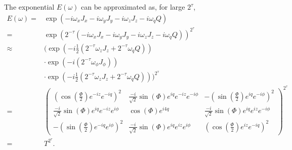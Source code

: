 \documentclass{jors}
\begin{document}
		The exponential \(E(\omega)\) can be approximated as, for large \(2^\tau\),
		\begin{align}
			E(\omega) =& \exp\left(-i\omega_x J_x - i\omega_y J_y - i\omega_z J_z - i\omega_q Q\right)\\
			=& \exp\left(2^{-\tau}\left(-i\omega_x J_x - i\omega_y J_y - i\omega_z J_z - i\omega_q Q\right)\right)^{2^\tau}\\
			\approx& \biggl(\exp\left(-i\frac12\left(2^{-\tau} \omega_z J_z + 2^{-\tau}\omega_q Q\right)\right)\nonumber\\
			&\cdot\exp\left(-i\left(2^{-\tau} \omega_\phi J_\phi\right)\right)\nonumber\\
			&\cdot\exp\left(-i\frac12\left(2^{-\tau} \omega_z J_z + 2^{-\tau} \omega_q Q\right)\right)\biggr)^{2^\tau}\\
			=& \begin{pmatrix}
				\left(\cos\left(\frac{\Phi}{2}\right) e^{-iz}e^{-iq}\right)^2 & \frac{-i}{\sqrt{2}} \sin(\Phi)e^{iq}e^{-iz}e^{-i\phi} & -\left(\sin\left(\frac{\Phi}{2}\right)e^{iq}e^{-i\phi}\right)^2\\
				\frac{-i}{\sqrt{2}} \sin(\Phi)e^{iq}e^{-iz}e^{i\phi} & \cos(\Phi)e^{i4q} & \frac{-i}{\sqrt{2}} \sin(\Phi)e^{iq}e^{iz}e^{-i\phi}\\
				-\left(\sin\left(\frac{\Phi}{2}\right)e^{-iq}e^{i\phi}\right)^2 & \frac{-i}{\sqrt{2}} \sin(\Phi)e^{iq}e^{iz}e^{i\phi} & \left(\cos\left(\frac{\Phi}{2}\right) e^{iz}e^{-iq}\right)^2
			\end{pmatrix}^{2^\tau}\\
			=& T^{2^\tau}.
		\end{align}
\end{document}
